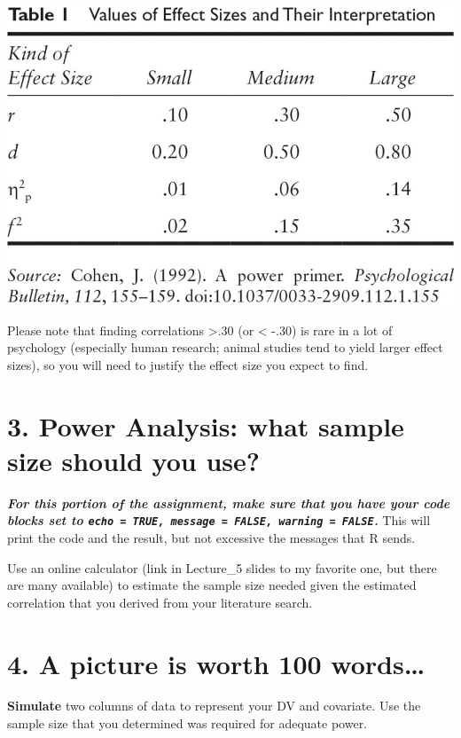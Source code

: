 \documentclass[
]{book}
\begin{document}
\includegraphics{Figs/effect_size.jpg}

Please note that finding correlations \textgreater.30 (or \textless{} -.30) is rare in a lot of psychology (especially human research; animal studies tend to yield larger effect sizes), so you will need to justify the effect size you expect to find.

\section*{3. Power Analysis: what sample size should you use?}\label{power-analysis-what-sample-size-should-you-use}

\textbf{\emph{For this portion of the assignment, make sure that you have your code blocks set to \texttt{echo\ =\ TRUE,\ message\ =\ FALSE,\ warning\ =\ FALSE}.}} This will print the code and the result, but not excessive the messages that R sends.

Use an online calculator (link in Lecture\_5 slides to my favorite one, but there are many available) to estimate the sample size needed given the estimated correlation that you derived from your literature search.

\section*{4. A picture is worth 100 words\ldots{}}\label{a-picture-is-worth-100-words}

\textbf{Simulate} two columns of data to represent your DV and covariate. Use the sample size that you determined was required for adequate power.
\end{document}
